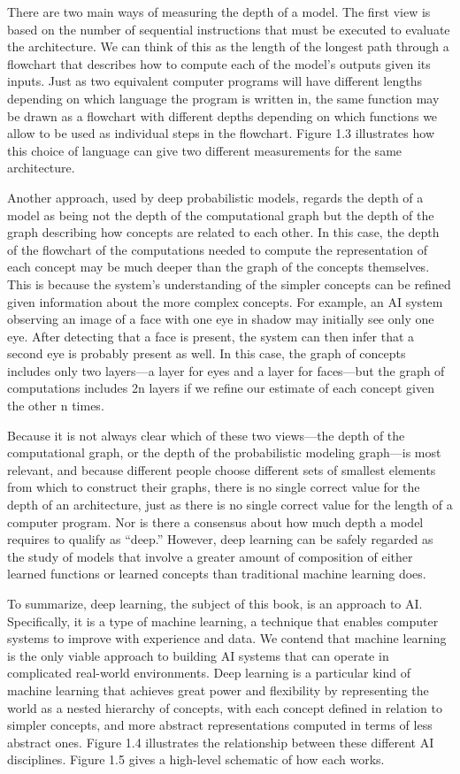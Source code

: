 \documentclass[11pt]{article}
\begin{document}
There are two main ways of measuring the depth of a model.
The first view is based on the number of sequential instructions that must be executed to evaluate the architecture.
We can think of this as the length of the longest path through a flowchart that describes how to compute each of the model’s outputs given its inputs.
Just as two equivalent computer programs will have different lengths depending on which language the program is written in, the same function may be drawn as a flowchart with different depths depending on which functions we allow to be used as individual steps in the flowchart.
Figure 1.3 illustrates how this choice of language can give two different measurements for the same architecture.

Another approach, used by deep probabilistic models, regards the depth of a model as being not the depth of the computational graph but the depth of the graph describing how concepts are related to each other.
In this case, the depth of the flowchart of the computations needed to compute the representation of each concept may be much deeper than the graph of the concepts themselves.
This is because the system’s understanding of the simpler concepts can be refined given information about the more complex concepts.
For example, an AI system observing an image of a face with one eye in shadow may initially see only one eye.
After detecting that a face is present, the system can then infer that a second eye is probably present as well.
In this case, the graph of concepts includes only two layers—a layer for eyes and a layer for faces—but the graph of computations includes 2n layers if we reﬁne our estimate of each concept given the other n times.

Because it is not always clear which of these two views—the depth of the
computational graph, or the depth of the probabilistic modeling graph—is most
relevant, and because diﬀerent people choose diﬀerent sets of smallest elements
from which to construct their graphs, there is no single correct value for the
depth of an architecture, just as there is no single correct value for the length of
a computer program. Nor is there a consensus about how much depth a model
requires to qualify as “deep.” However, deep learning can be safely regarded as the
study of models that involve a greater amount of composition of either learned
functions or learned concepts than traditional machine learning does.

To summarize, deep learning, the subject of this book, is an approach to AI.
Speciﬁcally, it is a type of machine learning, a technique that enables computer
systems to improve with experience and data. We contend that machine learning
is the only viable approach to building AI systems that can operate in complicated
real-world environments. Deep learning is a particular kind of machine learning
that achieves great power and ﬂexibility by representing the world as a nested
hierarchy of concepts, with each concept deﬁned in relation to simpler concepts, and
more abstract representations computed in terms of less abstract ones. Figure 1.4
illustrates the relationship between these diﬀerent AI disciplines. Figure 1.5 gives
a high-level schematic of how each works.
\end{document}
